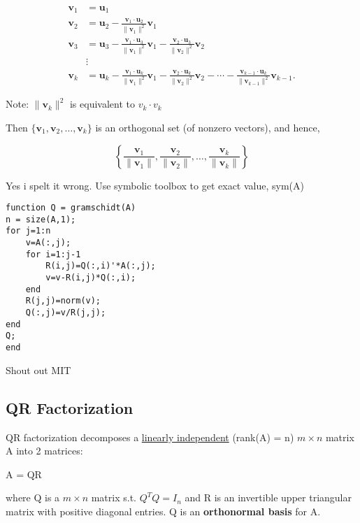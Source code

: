 \documentclass{article}
\newcommand{\sbreak}{\vspace{10pt}}
\begin{document}
\begin{align*}
    \mathbf{v}_1 &= \mathbf{u}_1 \\
    \mathbf{v}_2 &= \mathbf{u}_2 - \frac{\mathbf{v}_1 \cdot \mathbf{u}_2}{\|\mathbf{v}_1\|^2} \mathbf{v}_1 \\
    \mathbf{v}_3 &= \mathbf{u}_3 - \frac{\mathbf{v}_1 \cdot \mathbf{u}_3}{\|\mathbf{v}_1\|^2} \mathbf{v}_1 - \frac{\mathbf{v}_2 \cdot \mathbf{u}_3}{\|\mathbf{v}_2\|^2} \mathbf{v}_2 \\
    &\vdots \\
    \mathbf{v}_k &= \mathbf{u}_k - \frac{\mathbf{v}_1 \cdot \mathbf{u}_k}{\|\mathbf{v}_1\|^2} \mathbf{v}_1 - \frac{\mathbf{v}_2 \cdot \mathbf{u}_k}{\|\mathbf{v}_2\|^2} \mathbf{v}_2 - \cdots - \frac{\mathbf{v}_{k-1} \cdot \mathbf{u}_k}{\|\mathbf{v}_{k-1}\|^2} \mathbf{v}_{k-1}.
\end{align*}

\sbreak

Note: $\|\mathbf{v}_k\|^2$ is equivalent to $v_k \cdot v_k$

\sbreak

Then $\{ \mathbf{v}_1, \mathbf{v}_2, \dots, \mathbf{v}_k \}$ is an orthogonal set (of nonzero vectors), and hence,

\[
\left\{ \frac{\mathbf{v}_1}{\|\mathbf{v}_1\|}, \frac{\mathbf{v}_2}{\|\mathbf{v}_2\|}, \dots, \frac{\mathbf{v}_k}{\|\mathbf{v}_k\|} \right\}
\]

\begin{tcolorbox}[title=MATLAB tip, colback=blue!5, colframe=blue!80!black]
    Yes i spelt it wrong. Use symbolic toolbox to get exact value, sym(A)
    \begin{lstlisting}
function Q = gramschidt(A)
n = size(A,1);
for j=1:n
    v=A(:,j);
    for i=1:j-1
        R(i,j)=Q(:,i)'*A(:,j);
        v=v-R(i,j)*Q(:,i);
    end
    R(j,j)=norm(v);
    Q(:,j)=v/R(j,j);
end
Q;
end
    \end{lstlisting}
    Shout out MIT
\end{tcolorbox}

\subsection{QR Factorization}
QR factorization decomposes a \underline{linearly independent} (rank(A) = n) $m \times n$ matrix A into 2 matrices:
\begin{center}
    A = QR
\end{center}
where Q is a $m\times n$ matrix s.t. $Q^TQ=I_n$ and R is an invertible upper triangular matrix with positive diagonal entries. Q is an \textbf{orthonormal basis} for A.
\end{document}
